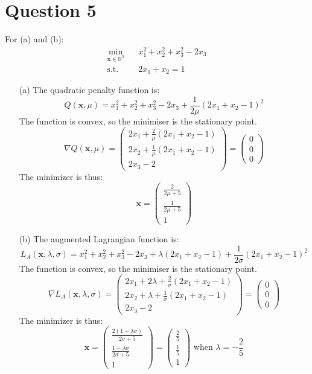 \documentclass{article}
\begin{document}
\section*{Question 5}
For (a) and (b):
\begin{align*}
\min_{\mathbf{x}\in\mathbb{R}^3} \ \ \ \ & x_1^2+x_2^2+x_3^2-2x_3\\
    \text{s.t. } \ \ \ & 2x_1+x_2=1
\end{align*}
\begin{itemize}
    \item[(a)] The quadratic penalty function is:
    \[
    Q(\mathbf{x},\mu) = x_1^2+x_2^2+x_3^2-2x_3 + \frac{1}{2\mu}(2x_1+x_2-1)^2
    \]
    The function is convex, so the minimiser is the stationary point.
    \[
    \nabla  Q(\mathbf{x},\mu) = \begin{pmatrix}
    2x_1 + \frac{2}{\mu}(2x_1+x_2-1)\\2x_2 + \frac{1}{\mu}(2x_1+x_2-1)\\2x_3-2
    \end{pmatrix} = \begin{pmatrix}
    0\\0\\0
    \end{pmatrix}
    \]
    The minimizer is thus:
    \[\mathbf{x}=\begin{pmatrix}
    \frac{2}{2\mu+5}\\\frac1{2\mu+5}\\1
    \end{pmatrix}
    \]
    
\item[(b)] The augmented Lagrangian function is:
    \[
    L_A(\mathbf{x},\lambda,\sigma) = x_1^2+x_2^2+x_3^2-2x_3 + \lambda(2x_1+x_2-1)+ \frac{1}{2\sigma}(2x_1+x_2-1)^2
    \]
    The function is convex, so the minimiser is the stationary point.
    \[
    \nabla  L_A(\mathbf{x},\lambda,\sigma) = \begin{pmatrix}
    2x_1 + 2\lambda+ \frac{2}{\sigma}(2x_1+x_2-1)\\2x_2 + \lambda+ \frac{1}{\sigma}(2x_1+x_2-1)\\2x_3-2
    \end{pmatrix} = \begin{pmatrix}
    0\\0\\0
    \end{pmatrix}
    \]
    The minimizer is thus:
    \[\mathbf{x}=\begin{pmatrix}
    \frac{2(1-\lambda\sigma)}{2\sigma+5}\\\frac{1-\lambda\sigma}{2\sigma+5}\\1
    \end{pmatrix} =\begin{pmatrix}
    \frac 25\\\frac 15\\1
    \end{pmatrix} \text{ when }\lambda = -\frac 25
    \]

\end{itemize}
\end{document}
